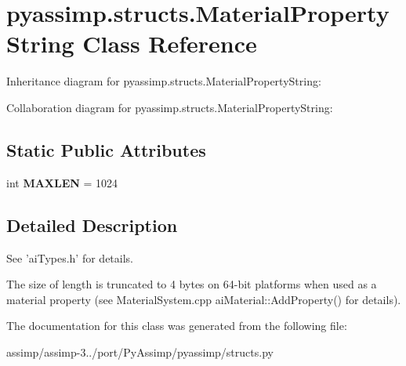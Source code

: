 \hypertarget{classpyassimp_1_1structs_1_1_material_property_string}{\section{pyassimp.\+structs.\+Material\+Property\+String Class Reference}
\label{classpyassimp_1_1structs_1_1_material_property_string}
}


Inheritance diagram for pyassimp.\+structs.\+Material\+Property\+String\+:


Collaboration diagram for pyassimp.\+structs.\+Material\+Property\+String\+:
\subsection*{Static Public Attributes}
\begin{DoxyCompactItemize}
\item 
\hypertarget{classpyassimp_1_1structs_1_1_material_property_string_a00cd4d8ef93c7b26ab7dacab90938307}{int {\bfseries M\+A\+X\+L\+E\+N} = 1024}\label{classpyassimp_1_1structs_1_1_material_property_string_a00cd4d8ef93c7b26ab7dacab90938307}

\end{DoxyCompactItemize}


\subsection{Detailed Description}
\begin{DoxyVerb}See 'aiTypes.h' for details.

The size of length is truncated to 4 bytes on 64-bit platforms when used as a
material property (see MaterialSystem.cpp aiMaterial::AddProperty() for details).
\end{DoxyVerb}
 

The documentation for this class was generated from the following file\+:\begin{DoxyCompactItemize}
\item 
assimp/assimp-\/3../port/\+Py\+Assimp/pyassimp/structs.\+py\end{DoxyCompactItemize}
